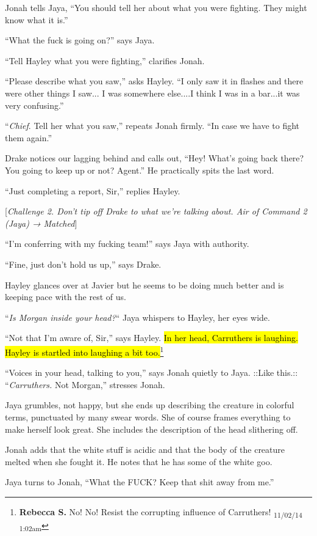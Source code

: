 Jonah tells Jaya, ``You should tell her about what you were fighting. They might know what it is.''

``What the fuck is going on?'' says Jaya.

``Tell Hayley what you were fighting,'' clarifies Jonah.

``Please describe what you saw,'' asks Hayley.  ``I only saw it in flashes and there were other things I saw... I was somewhere else....I think I was in a bar...it was very confusing.''

``\textit{Chief}.  Tell her what you saw,'' repeats Jonah firmly.  ``In case we have to fight them again.''

Drake notices our lagging behind and calls out, ``Hey! What's going back there?  You going to keep up or not?  Agent.''  He practically spits the last word.

``Just completing a report, Sir,'' replies Hayley.

{[}\textit{Challenge 2.  Don't tip off Drake to what we're talking about.  Air of Command 2 (Jaya) → Matched}{]}

``I'm conferring with my fucking team!'' says Jaya with authority.

``Fine, just don't hold us up,'' says Drake.

Hayley glances over at Javier but he seems to be doing much better and is keeping pace with the rest of us.

``\textit{Is Morgan inside your head?}`` Jaya whispers to Hayley, her eyes wide.

``Not that I'm aware of, Sir,'' says Hayley.  \hl{In her head, Carruthers is laughing.  Hayley is startled into laughing a bit too.}\footnote{\textbf{Rebecca S. }No! No! Resist the corrupting influence of Carruthers! \textsubscript{11/02/14 1:02am}}

``Voices in your head, talking to you,'' says Jonah quietly to Jaya.   {\color[RGB]{74,134,232}::Like this.::  } ``\textit{Carruthers. } Not Morgan,'' stresses Jonah.

Jaya grumbles, not happy, but she ends up describing the creature in colorful terms, punctuated by many swear words.  She of course frames everything to make herself look great.  She includes the description of the head slithering off. 

Jonah adds that the white stuff is acidic and that the body of the creature melted when she fought it.  He notes that he has some of the white goo.

Jaya turns to Jonah, ``What the FUCK?  Keep that shit away from me.''


